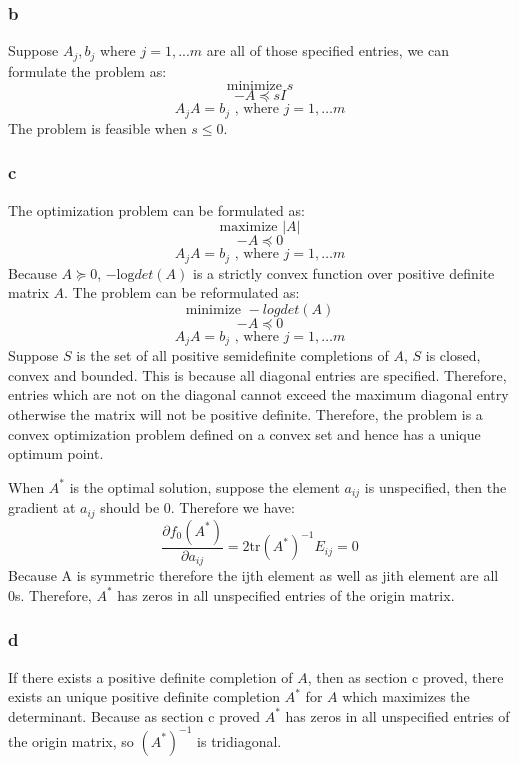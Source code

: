 \documentclass[10pt,a4paper]{article}
\begin{document}
\subsubsection{b}
Suppose $A_j, b_j$ where $j=1,...m$ are all of those
specified entries, we can formulate the problem as:
$$
\text{minimize } s
$$
$$
-A\preceq sI
$$
$$
A_jA=b_j \text{  , where } j=1,\dots m
$$
The problem is feasible when $s\leq0$.

\subsubsection{c}
The optimization problem can be formulated as:
$$
\text{maximize } |A|
$$
$$
-A\preceq 0
$$
$$
A_jA=b_j \text{  , where } j=1,\dots m
$$
Because $A\succeq0$, $-\text{log}det(A)$ is a strictly
convex function over positive definite matrix $A$. The
problem can be reformulated as:
$$
\text{minimize } -logdet(A)
$$
$$
-A\preceq 0
$$
$$
A_jA=b_j \text{  , where } j=1,\dots m
$$
Suppose $S$ is the set of all positive semidefinite
completions of $A$, $S$ is closed, convex and bounded. This
is because all diagonal entries are specified. Therefore,
entries which are not on the diagonal cannot exceed the
maximum diagonal entry otherwise the matrix will not be
positive definite. Therefore, the problem is a convex
optimization problem defined on a convex set and hence has a
unique optimum point.

When $A^*$ is the optimal solution, suppose the element
$a_{ij}$ is unspecified, then the gradient at $a_{ij}$
should be $0$. Therefore we have:
$$
\frac{\partial f_0(A^*)}{\partial a_{ij}} = 2\text{tr}(A^*)^{-1}E_{ij}=0
$$
Because A is symmetric therefore the ijth element as well as
jith element are all 0s. Therefore, $A^*$ has zeros in
all unspecified entries of the origin matrix.


\subsubsection{d}
If there exists a positive definite completion of $A$, then
as section c proved, there exists an unique positive
definite completion $A^*$ for $A$ which maximizes the
determinant. Because as section c proved $A^*$ has zeros in
all unspecified entries of the origin matrix, so
$(A^*)^{-1}$ is tridiagonal.
\end{document}
